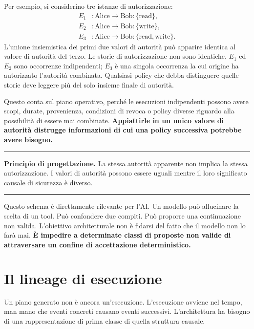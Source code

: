 \documentclass[10pt,oneside,openany]{book}
\newcommand{\principle}[1]{%
  \vspace{4pt}
  \noindent\begin{minipage}{\linewidth}
  \hrule\vspace{5pt}
  \small\sffamily\raggedright\textbf{Principio di progettazione.} #1
  \vspace{5pt}\hrule
  \end{minipage}\vspace{4pt}
}
\begin{document}
Per esempio, si considerino tre istanze di autorizzazione:
\[
\begin{aligned}
E_1 &: \text{Alice} \rightarrow \text{Bob}: \{\mathrm{read}\},\\
E_2 &: \text{Alice} \rightarrow \text{Bob}: \{\mathrm{write}\},\\
E_3 &: \text{Alice} \rightarrow \text{Bob}: \{\mathrm{read},\mathrm{write}\}.
\end{aligned}
\]
L'unione insiemistica dei primi due valori di autorità può apparire identica al valore di autorità del terzo. Le storie di autorizzazione non sono identiche. $E_1$ ed $E_2$ sono occorrenze indipendenti; $E_3$ è una singola occorrenza la cui origine ha autorizzato l'autorità combinata. Qualsiasi policy che debba distinguere quelle storie deve leggere più del solo insieme finale di autorità.

Questo conta sul piano operativo, perché le esecuzioni indipendenti possono avere scopi, durate, provenienza, condizioni di revoca o policy diverse riguardo alla possibilità di essere mai combinate. \textbf{Appiattirle in un unico valore di autorità distrugge informazioni di cui una policy successiva potrebbe avere bisogno.}

\principle{La stessa autorità apparente non implica la stessa autorizzazione. I valori di autorità possono essere uguali mentre il loro significato causale di sicurezza è diverso.}

Questo schema è direttamente rilevante per l'AI. Un modello può allucinare la scelta di un tool. Può confondere due compiti. Può proporre una continuazione non valida. L'obiettivo architetturale non è fidarsi del fatto che il modello non lo farà mai. \textbf{È impedire a determinate classi di proposte non valide di attraversare un confine di accettazione deterministico.}

\chapter{Il lineage di esecuzione}

Un piano generato non è ancora un'esecuzione. L'esecuzione avviene nel tempo, man mano che eventi concreti causano eventi successivi. L'architettura ha bisogno di una rappresentazione di prima classe di quella struttura causale.
\end{document}
